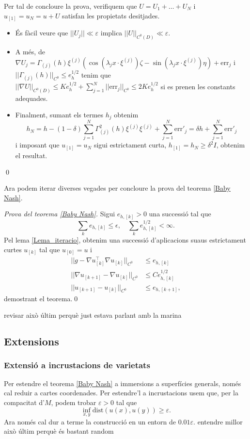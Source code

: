 Per tal de concloure la prova, verifiquem que $U=U_1+\dots+U_N$ i $u_{[1]}=u_N=u+U$ satisfan les propietats desitjades.

\begin{itemize}
    \item És fàcil veure que $||U_j|| \ll \varepsilon$ implica $||U||_{C^0(D)} \ll \varepsilon$.
    \item A més, de $\nabla U_j = \Gamma_{(j)}(h)\xi^{(j)}(\cos(\lambda_j x\cdot\xi^{(j)})\zeta - \sin(\lambda_j x\cdot\xi^{(j)})\eta) + \text{err}_j$ i $||\Gamma_{(j)}(h)||_{C^0} \le e_h^{1/2}$ tenim que $||\nabla U||_{C^0(D)} \le Ke_h^{1/2} + \sum_{j=1}^N ||\text{err}_j||_{C^0} \le 2Ke_h^{1/2}$ si es prenen les constants adequades. 
    \item Finalment, sumant els termes $h_j$ obtenim 
    \begin{equation*}
        h_N = h-(1-\delta)\sum_{j=1}^N \Gamma^2_{(j)}(h)\xi^{(j)}\xi^{(j)} + \sum_{j=1}^N \text{err}'_j = \delta h + \sum_{j=1}^N \text{err}'_j
    \end{equation*}
    i imposant que $u_{[1]} = u_N$ sigui estrictament curta, $h_{[1]}=h_N \ge \delta^2 I$, obtenim el resultat.
\end{itemize}
\qed

Ara podem iterar diverses vegades per concloure la prova del teorema \ref{Baby Nash}.

\textit{Prova del teorema \ref{Baby Nash}.} Sigui $e_{h,[k]}>0$ una successió tal que
$$\sum_{k}e_{h,[k]}\le \epsilon,\quad\sum_{k}e_{h,[k]}^{1/2}<\infty.$$ 
Pel lema \ref{Lema_iteracio}, obtenim una successió d'aplicacions suaus estrictament curtes $u_{[k]}$ tal que $u_{[0]}=u$ i
\begin{equation*}
    \begin{aligned}
    ||g-\nabla u_{[k]}^\intercal\nabla u_{[k]}||_{C^0} &\le e_{h,[k]}\\
    ||\nabla u_{[k+1]}-\nabla u_{[k]}||_{C^0} &\le Ce^{1/2}_{h,[k]}\\
    ||u_{[k+1]}-u_{[k]}||_{C^0} &\le e_{h,[k+1]},
    \end{aligned}
\end{equation*}
demostrant el teorema.\qed

{\color{blue} revisar això últim perquè just estava parlant amb la marina}
\subsection{Extensions}
\subsubsection{Extensió a incrustacions de varietats}
Per estendre el teorema \ref{Baby Nash} a immersions a superfícies generals, només cal reduir a cartes coordenades. Per estendre'l a incrustacions usem que, per la compacitat d'$M$, podem trobar $\varepsilon>0$ tal que 
$$\inf_{x,y} \text{dist}(u(x), u(y))\ge\varepsilon.$$ Ara només cal dur a terme la construcció en un entorn de $0.01\varepsilon$.{\color{blue} entendre millor això últim perquè és bastant random}
